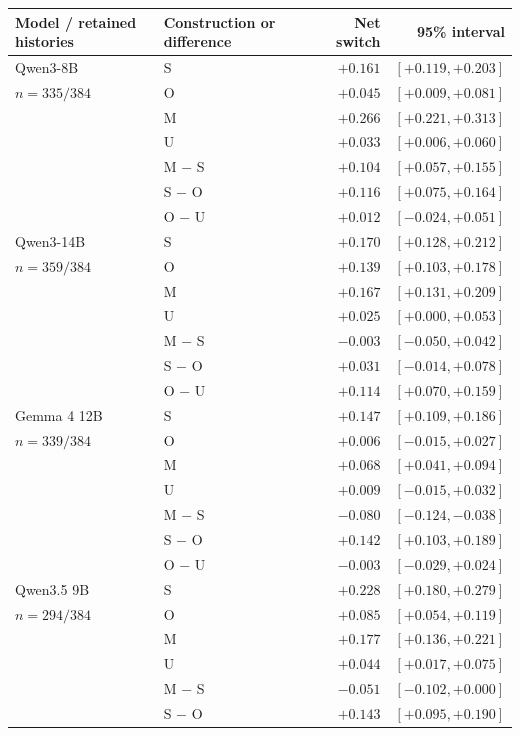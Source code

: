 \begin{table}[t]
\centering
\small
\setlength{\tabcolsep}{8pt}
\begin{tabular}{@{}llrr@{}}
\toprule
Model / retained histories & Construction or difference & Net switch & 95\% interval \\
\midrule
Qwen3-8B & S & $+0.161$ & $[+0.119, +0.203]$ \\
$n=335/384$ & O & $+0.045$ & $[+0.009, +0.081]$ \\
 & M & $+0.266$ & $[+0.221, +0.313]$ \\
 & U & $+0.033$ & $[+0.006, +0.060]$ \\
 & M $-$ S & $+0.104$ & $[+0.057, +0.155]$ \\
 & S $-$ O & $+0.116$ & $[+0.075, +0.164]$ \\
 & O $-$ U & $+0.012$ & $[-0.024, +0.051]$ \\
\midrule
Qwen3-14B & S & $+0.170$ & $[+0.128, +0.212]$ \\
$n=359/384$ & O & $+0.139$ & $[+0.103, +0.178]$ \\
 & M & $+0.167$ & $[+0.131, +0.209]$ \\
 & U & $+0.025$ & $[+0.000, +0.053]$ \\
 & M $-$ S & $-0.003$ & $[-0.050, +0.042]$ \\
 & S $-$ O & $+0.031$ & $[-0.014, +0.078]$ \\
 & O $-$ U & $+0.114$ & $[+0.070, +0.159]$ \\
\midrule
Gemma 4 12B & S & $+0.147$ & $[+0.109, +0.186]$ \\
$n=339/384$ & O & $+0.006$ & $[-0.015, +0.027]$ \\
 & M & $+0.068$ & $[+0.041, +0.094]$ \\
 & U & $+0.009$ & $[-0.015, +0.032]$ \\
 & M $-$ S & $-0.080$ & $[-0.124, -0.038]$ \\
 & S $-$ O & $+0.142$ & $[+0.103, +0.189]$ \\
 & O $-$ U & $-0.003$ & $[-0.029, +0.024]$ \\
\midrule
Qwen3.5 9B & S & $+0.228$ & $[+0.180, +0.279]$ \\
$n=294/384$ & O & $+0.085$ & $[+0.054, +0.119]$ \\
 & M & $+0.177$ & $[+0.136, +0.221]$ \\
 & U & $+0.044$ & $[+0.017, +0.075]$ \\
 & M $-$ S & $-0.051$ & $[-0.102, +0.000]$ \\
 & S $-$ O & $+0.143$ & $[+0.095, +0.190]$ \\

\end{tabular}
\end{table}
